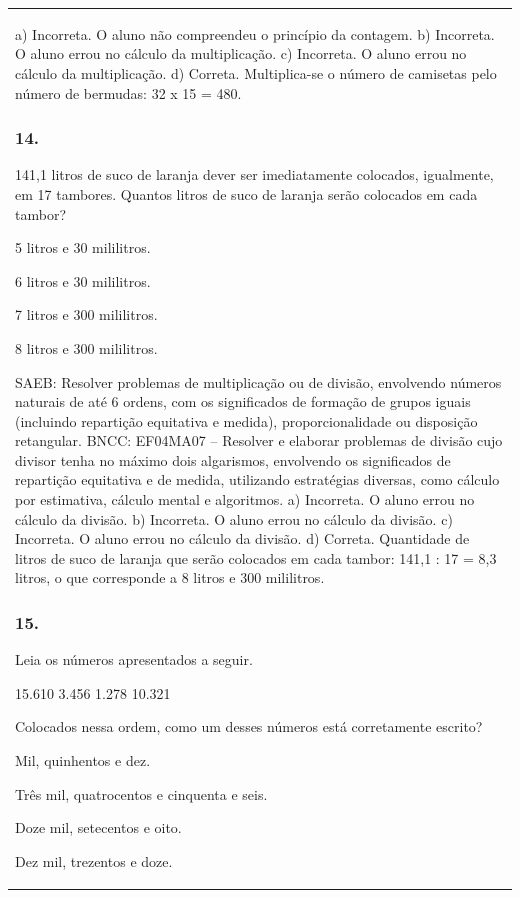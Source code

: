 \begin{mdframed}[linewidth=2pt,linecolor=salmao,roundcorner=2pt]
\begin{escolha}
{{{\begin{longtable}[]{@{}l@{}}
\begin{itemize}
{a) Incorreta. O aluno não compreendeu o princípio da contagem.
b) Incorreta. O aluno errou no cálculo da multiplicação.
c) Incorreta. O aluno errou no cálculo da multiplicação.
d) Correta. Multiplica-se o número de camisetas pelo número de bermudas: 32 x 15 = 480.

\subsubsection{14.}

141,1 litros de suco de laranja dever ser imediatamente colocados,
igualmente, em 17 tambores. Quantos litros de suco de laranja serão
colocados em cada tambor?

\begin{escolha}
\item
  5 litros e 30 mililitros.
\item
  6 litros e 30 mililitros.
\item
  7 litros e 300 mililitros.
\item
  8 litros e 300 mililitros.
\end{escolha}

SAEB: Resolver problemas de multiplicação ou de divisão,
envolvendo números naturais de até 6 ordens, com os significados de
formação de grupos iguais (incluindo repartição equitativa e medida),
proporcionalidade ou disposição retangular.
BNCC: EF04MA07 -- Resolver e elaborar problemas de divisão cujo divisor tenha no máximo dois algarismos,
envolvendo os significados de repartição equitativa e de medida, utilizando estratégias diversas,
como cálculo por estimativa, cálculo mental e algoritmos.
a) Incorreta. O aluno errou no cálculo da divisão.
b) Incorreta. O aluno errou no cálculo da divisão.
c) Incorreta. O aluno errou no cálculo da divisão.
d) Correta. Quantidade de litros de suco de laranja que serão colocados em cada
tambor: 141,1 : 17 = 8,3 litros, o que corresponde a 8 litros e 300 mililitros.

\subsubsection{15.}

Leia os números apresentados a seguir.

15.610
3.456
1.278
10.321

Colocados nessa ordem, como um desses números está corretamente escrito?

\begin{escolha}
\item Mil, quinhentos e dez.
\item Três mil, quatrocentos e cinquenta e seis.
\item Doze mil, setecentos e oito.
\item Dez mil, trezentos e doze.
\end{escolha}

}
\end{itemize}
\end{longtable}}}}
\end{escolha}
\end{mdframed}
